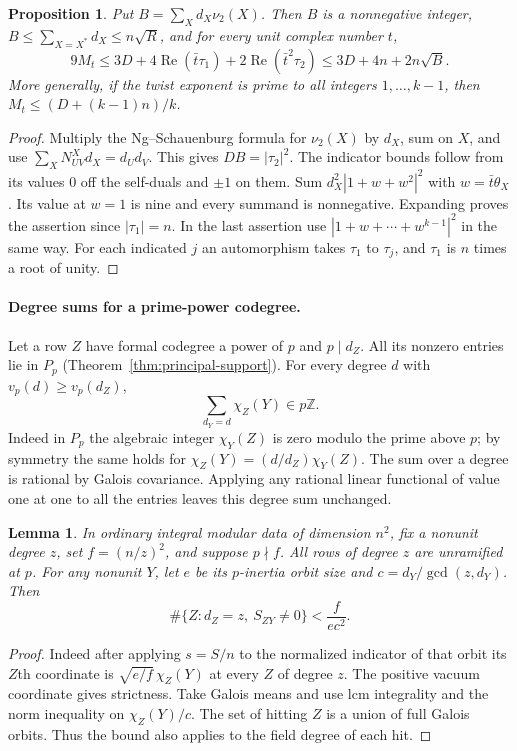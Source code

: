 \documentclass[11pt,a4paper]{article}
\numberwithin{equation}{section}
\newtheorem{proposition}[theorem]{Proposition}
\newtheorem{lemma}[theorem]{Lemma}
\theoremstyle{remark}
\newcommand{\ZZ}{\mathbb Z}
\begin{document}
\begin{proposition}\label{por:pr:fejer}
Put $B=\sum_X d_X\nu_2(X)$. Then $B$ is a nonnegative integer,
$B\le\sum_{X=X^*}d_X\le n\sqrt R$, and for every unit complex number $t$,
\[
  9 M_t\le 3D+4\operatorname{Re}(\bar t\tau_1)
                    +2\operatorname{Re}(\bar t^2\tau_2)
         \le 3D+4n+2n\sqrt B.
\]
More generally, if the twist exponent is prime to all integers $1,\ldots,k-1$, then $M_t\le (D+(k-1)n)/k$.
\end{proposition}
\begin{proof}
Multiply the Ng--Schauenburg formula for $\nu_2(X)$ by $d_X$, sum on $X$, and use $\sum_X N_{UV}^X d_X=d_Ud_V$. This gives $DB=|\tau_2|^2$. The indicator bounds follow from its values $0$ off the self-duals and $\pm1$ on them. Sum $d_X^2|1+w+w^2|^2$ with $w=\bar t\theta_X$. Its value at $w=1$ is nine and every summand is nonnegative. Expanding proves the assertion since $|\tau_1|=n$. In the last assertion use $|1+w+\cdots+w^{k-1}|^2$ in the same way. For each indicated $j$ an automorphism takes $\tau_1$ to $\tau_j$, and $\tau_1$ is $n$ times a root of unity.
\end{proof}

\paragraph{Degree sums for a prime-power codegree.}
Let a row $Z$ have formal codegree a power of $p$ and $p\mid d_Z$. All its nonzero entries lie in $P_p$ (Theorem~\ref{thm:principal-support}). For every degree $d$ with $v_p(d)\ge v_p(d_Z)$,
\[
                 \sum_{d_Y=d}\chi_Z(Y)\in p\ZZ.
\]
Indeed in $P_p$ the algebraic integer $\chi_Y(Z)$ is zero modulo the prime above $p$; by symmetry the same holds for $\chi_Z(Y)=(d/d_Z)\chi_Y(Z)$. The sum over a degree is rational by Galois covariance. Applying any rational linear functional of value one at one to all the entries leaves this degree sum unchanged.

\begin{lemma}\label{por:orbitbound}
In ordinary integral modular data of dimension $n^2$, fix a nonunit degree $z$, set $f=(n/z)^2$, and suppose $p\nmid f$. All rows of degree $z$ are unramified at $p$. For any nonunit $Y$, let $e$ be its $p$-inertia orbit size and $c=d_Y/\gcd(z,d_Y)$. Then
\[
       \#\{Z:d_Z=z,\ S_{ZY}\ne0\}<\frac{f}{ec^2}.
\]
\end{lemma}
\begin{proof}
Indeed after applying $s=S/n$ to the normalized indicator of that orbit its $Z$th coordinate is $\sqrt{e/f}\,\chi_Z(Y)$ at every $Z$ of degree $z$. The positive vacuum coordinate gives strictness. Take Galois means and use lcm integrality and the norm inequality on $\chi_Z(Y)/c$. The set of hitting $Z$ is a union of full Galois orbits. Thus the bound also applies to the field degree of each hit.
\end{proof}
\end{document}
